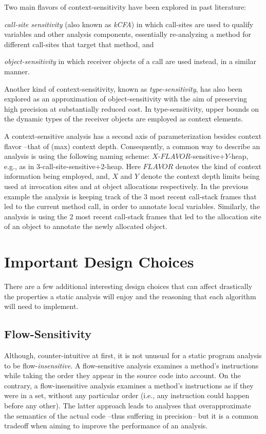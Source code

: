 Two main flavors of context-sensitivity have been explored in past literature: \begin{inparaenum}[(1)]
\item \emph{call-site sensitivity} (also known as \emph{kCFA}) in which call-sites are used to qualify variables and other analysis components, essentially re-analyzing a method for different call-sites that target that method, and
\item \emph{object-sensitivity} in which receiver objects of a call are used instead, in a similar manner.
\end{inparaenum}
Another kind of context-sensitivity, known as \emph{type-sensitivity}, has also been explored as an approximation of object-sensitivity with the aim of preserving high precision at substantially reduced cost. In type-sensitivity, upper bounds on the dynamic types of the receiver objects are employed as context elements. 

A context-sensitive analysis has a second axis of parameterization besides context flavor --that of (max) context depth. Consequently, a common way to describe an analysis is using the following naming scheme: $X$-$FLAVOR$-sensitive+$Y$-heap, e.g., as in 3-call-site-sensitive+2-heap. Here $FLAVOR$ denotes the kind of context information being employed, and, $X$ and $Y$ denote the context depth limits being used at invocation sites and at object allocations respectively. In the previous example the analysis is keeping track of the 3 most recent call-stack frames that led to the current method call, in order to annotate local variables. Similarly, the analysis is using the 2 most recent call-stack frames that led to the allocation site of an object to annotate the newly allocated object.


\section{Important Design Choices}

There are a few additional interesting design choices that can affect drastically the properties a static analysis will enjoy and the reasoning that each algorithm will need to implement.

\subsection{Flow-Sensitivity} \label{flowSensitivity}

Although, counter-intuitive at first, it is not unusual for a static program analysis to be flow-\emph{insensitive}. A flow-sensitive analysis examines a method's instructions while taking the order they appear in the source code into account. On the contrary, a flow-insensitive analysis examines a method's instructions as if they were in a set, without any particular order (i.e., any instruction could happen before any other). The latter approach leads to analyses that overapproximate the semantics of the actual code --thus suffering in precision-- but it is a common tradeoff when aiming to improve the performance of an analysis.

